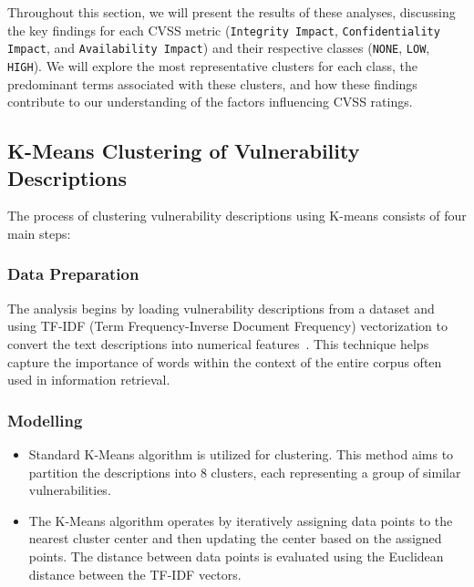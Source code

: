 Throughout this section, we will present the results of these analyses, discussing the key findings for each CVSS metric (\texttt{Integrity Impact}, \texttt{Confidentiality Impact}, and \texttt{Availability Impact}) and their respective classes (\texttt{NONE}, \texttt{LOW}, \texttt{HIGH}). We will explore the most representative clusters for each class, the predominant terms associated with these clusters, and how these findings contribute to our understanding of the factors influencing CVSS ratings.

\subsection{K-Means Clustering of Vulnerability Descriptions}

The process of clustering vulnerability descriptions using K-means consists of four main steps:

\subsubsection{Data Preparation}

The analysis begins by loading vulnerability descriptions from a dataset and using TF-IDF (Term Frequency-Inverse Document Frequency) vectorization to convert the text descriptions into numerical features~\cite{tfidf}. This technique helps capture the importance of words within the context of the entire corpus often used in information retrieval.

\subsubsection{Modelling}

\begin{itemize}

	\item Standard K-Means algorithm is utilized for clustering. This method aims to partition the descriptions into 8 clusters, each representing a group of similar vulnerabilities.
	\item The K-Means algorithm operates by iteratively assigning data points to the nearest cluster center and then updating the center based on the assigned points. The distance between data points is evaluated using the Euclidean distance between the TF-IDF vectors.
\end{itemize}

